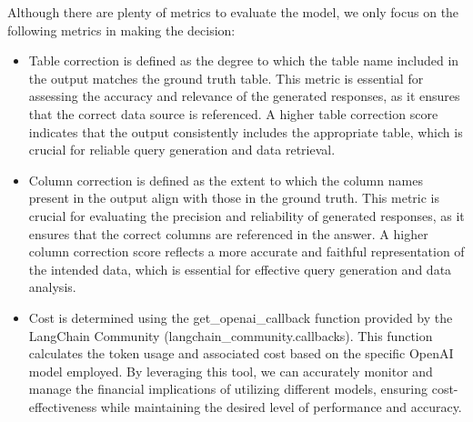     Although there are plenty of metrics to evaluate the model, we only focus on the following metrics in making the decision:
    \begin{itemize}
        \item Table correction is defined as the degree to which the table name included in the output matches the ground truth table. This metric is essential for assessing the accuracy and relevance of the generated responses, as it ensures that the correct data source is referenced. A higher table correction score indicates that the output consistently includes the appropriate table, which is crucial for reliable query generation and data retrieval.
        \item Column correction is defined as the extent to which the column names present in the output align with those in the ground truth. This metric is crucial for evaluating the precision and reliability of generated responses, as it ensures that the correct columns are referenced in the answer. A higher column correction score reflects a more accurate and faithful representation of the intended data, which is essential for effective query generation and data analysis.
        \item Cost is determined using the get\_openai\_callback function provided by the LangChain Community (langchain\_community.callbacks). This function calculates the token usage and associated cost based on the specific OpenAI model employed. By leveraging this tool, we can accurately monitor and manage the financial implications of utilizing different models, ensuring cost-effectiveness while maintaining the desired level of performance and accuracy.
    \end{itemize}